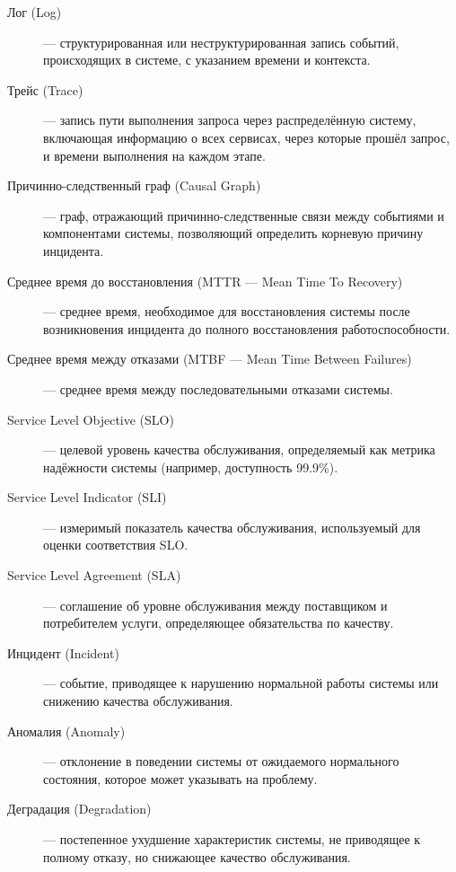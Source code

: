 \begin{sloppypar}
\begin{description}
    \item[Лог (Log)] — структурированная или неструктурированная запись событий, происходящих в системе, с указанием времени и контекста.
    
    \item[Трейс (Trace)] — запись пути выполнения запроса через распределённую систему, включающая информацию о всех сервисах, через которые прошёл запрос, и времени выполнения на каждом этапе.
    
    \item[Причинно-следственный граф (Causal Graph)] — граф, отражающий причинно-следственные связи между событиями и компонентами системы, позволяющий определить корневую причину инцидента.
    
    \item[Среднее время до восстановления (MTTR — Mean Time To Recovery)] — среднее время, необходимое для восстановления системы после возникновения инцидента до полного восстановления работоспособности.
    
    \item[Среднее время между отказами (MTBF — Mean Time Between Failures)] — среднее время между последовательными отказами системы.
    
    \item[Service Level Objective (SLO)] — целевой уровень качества обслуживания, определяемый как метрика надёжности системы (например, доступность 99.9\%).
    
    \item[Service Level Indicator (SLI)] — измеримый показатель качества обслуживания, используемый для оценки соответствия SLO.
    
    \item[Service Level Agreement (SLA)] — соглашение об уровне обслуживания между поставщиком и потребителем услуги, определяющее обязательства по качеству.
    
    \item[Инцидент (Incident)] — событие, приводящее к нарушению нормальной работы системы или снижению качества обслуживания.
    
    \item[Аномалия (Anomaly)] — отклонение в поведении системы от ожидаемого нормального состояния, которое может указывать на проблему.
    
    \item[Деградация (Degradation)] — постепенное ухудшение характеристик системы, не приводящее к полному отказу, но снижающее качество обслуживания.
    

\end{description}
\end{sloppypar}
